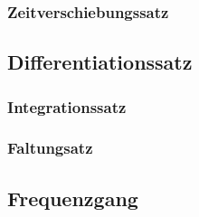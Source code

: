 \subsubsection{Zeitverschiebungssatz}


\subsection{Differentiationssatz}


\subsubsection{Integrationssatz}


\subsubsection{Faltungsatz}


\subsection{Frequenzgang}


